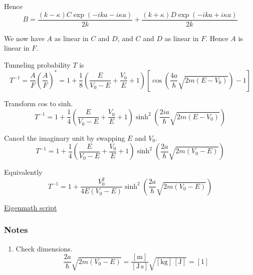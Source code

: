 Hence
\begin{equation*}
B=\frac{(k-\kappa)C\exp(-ika-i\kappa a)}{2k}+\frac{(k+\kappa)D\exp(-ika+i\kappa a)}{2k}
\end{equation*}

We now have $A$ as linear in $C$ and $D$, and $C$ and $D$ as linear in $F$.
Hence $A$ is linear in $F$.

\bigskip
Tunneling probability $T$ is
\begin{equation*}
T^{-1}=\frac{A}{F}\left(\frac{A}{F}\right)^*
=1+\frac{1}{8}\left(\frac{E}{V_0-E}+\frac{V_0}{E}+1\right)
\left[\cos\left(\frac{4a}{\hbar}\sqrt{2m(E-V_0)}\right)-1\right]
\tag{5}
\end{equation*}

Transform cos to sinh.
\begin{equation*}
T^{-1}=1+\frac{1}{4}\left(\frac{E}{V_0-E}+\frac{V_0}{E}+1\right)
\sinh^2\left(\frac{2ia}{\hbar}\sqrt{2m(E-V_0)}\right)
\tag{6}
\end{equation*}

Cancel the imaginary unit by swapping $E$ and $V_0$.
\begin{equation*}
T^{-1}=1+\frac{1}{4}\left(\frac{E}{V_0-E}+\frac{V_0}{E}+1\right)
\sinh^2\left(\frac{2a}{\hbar}\sqrt{2m(V_0-E)}\right)
\end{equation*}

Equivalently
\begin{equation*}
T^{-1}=1+\frac{V_0^2}{4E(V_0-E)}\sinh^2\left(\frac{2a}{\hbar}\sqrt{2m(V_0-E)}\right)
\tag{7}
\end{equation*}

\href{https://georgeweigt.github.io/examples/barrier-potential-demo.html}{Eigenmath script}



\subsubsection*{Notes}
\begin{enumerate}
\item
Check dimensions.
\begin{equation*}
\frac{2a}{\hbar}\sqrt{2m(V_0-E)}=\frac{[\text{m}]}{[\text{J}\,\text{s}]}
\sqrt{[\text{kg}]\,[\text{J}]}=[1]
\end{equation*}
\end{enumerate}


